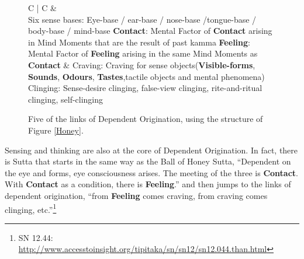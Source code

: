 \begin{figure}[H]
\begin{tabular*}{\textwidth}{C{\tabcolsep} | C{\tabcolsep}}
\toprule
{} &  \\
\midrule
Six sense bases:\newline
 Eye-base / ear-base / nose-base /\newline tongue-base / body-base / mind-base\newline\vspace{5mm}
 \textbf{Contact}:\newline
 Mental Factor of \textbf{Contact} arising in Mind Moments that are the result of past kamma\newline\vspace{5mm}
 \textbf{Feeling}:\newline
 Mental Factor of \textbf{Feeling} arising in the same Mind Moments as \textbf{Contact}
 &
 Craving:\newline
 Craving for sense objects\newline (\textbf{Visible-forms}, \textbf{Sounds}, \textbf{Odours}, \textbf{Tastes},\newline tactile objects and mental phenomena)
 \newline\vspace{5mm}
 Clinging:\newline
 Sense-desire clinging, false-view clinging, rite-and-ritual clinging, self-clinging
 \\
 
\bottomrule
\end{tabular*}
\caption{Five of the links of Dependent Origination, using the structure of Figure \ref{Honey}.}
\label{DepOrg}
\end{figure}

Sensing and thinking are also at the core of Dependent Origination. In fact, there is Sutta that starts in the same way as the Ball of Honey Sutta, “Dependent on the eye and forms, eye consciousness arises. The meeting of the three is \textbf{Contact}. With \textbf{Contact} as a condition, there is \textbf{Feeling}.” and then jumps to the links of dependent origination, “from \textbf{Feeling} comes craving, from craving comes clinging, etc.”\footnote{SN 12.44: \url{http://www.accesstoinsight.org/tipitaka/sn/sn12/sn12.044.than.html}}

